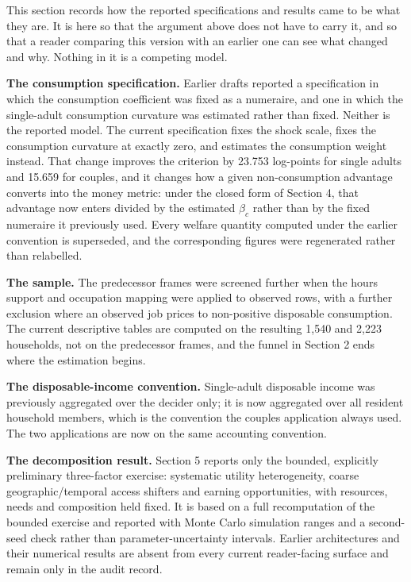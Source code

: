 \documentclass[11pt,a4paper]{article}
\begin{document}
This section records how the reported specifications and results came to be what they are. It is here so that the argument above does not have to carry it, and so that a reader comparing this version with an earlier one can see what changed and why. Nothing in it is a competing model.

\textbf{The consumption specification.} Earlier drafts reported a specification in which the consumption coefficient was fixed as a numeraire, and one in which the single-adult consumption curvature was estimated rather than fixed. Neither is the reported model. The current specification fixes the shock scale, fixes the consumption curvature at exactly zero, and estimates the consumption weight instead. That change improves the criterion by 23.753 log-points for single adults and 15.659 for couples, and it changes how a given non-consumption advantage converts into the money metric: under the closed form of Section 4, that advantage now enters divided by the estimated \(\beta_c\) rather than by the fixed numeraire it previously used. Every welfare quantity computed under the earlier convention is superseded, and the corresponding figures were regenerated rather than relabelled.

\textbf{The sample.} The predecessor frames were screened further when the hours support and occupation mapping were applied to observed rows, with a further exclusion where an observed job prices to non-positive disposable consumption. The current descriptive tables are computed on the resulting 1,540 and 2,223 households, not on the predecessor frames, and the funnel in Section 2 ends where the estimation begins.

\textbf{The disposable-income convention.} Single-adult disposable income was previously aggregated over the decider only; it is now aggregated over all resident household members, which is the convention the couples application always used. The two applications are now on the same accounting convention.

\textbf{The decomposition result.} Section 5 reports only the bounded, explicitly preliminary three-factor exercise: systematic utility heterogeneity, coarse geographic/temporal access shifters and earning opportunities, with resources, needs and composition held fixed. It is based on a full recomputation of the bounded exercise and reported with Monte Carlo simulation ranges and a second-seed check rather than parameter-uncertainty intervals. Earlier architectures and their numerical results are absent from every current reader-facing surface and remain only in the audit record.
\end{document}
